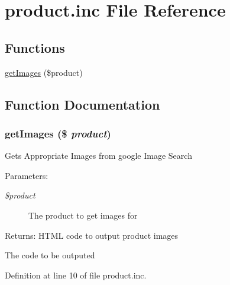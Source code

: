 \hypertarget{product_8inc}{
\section{product.inc File Reference}
\label{product_8inc}
}
\subsection*{Functions}
\begin{CompactItemize}
\item 
\hyperlink{product_8inc_9dbb778854cfe105058d7161ca8f058c}{getImages} (\$product)
\end{CompactItemize}


\subsection{Function Documentation}
\hypertarget{product_8inc_9dbb778854cfe105058d7161ca8f058c}{
\subsubsection{\setlength{\rightskip}{0pt plus 5cm}getImages (\$ {\em product})}}
\label{product_8inc_9dbb778854cfe105058d7161ca8f058c}


Gets Appropriate Images from google Image Search \begin{Desc}
\item[Parameters:]
\begin{description}
\item[{\em \$product}]The product to get images for \end{description}
\end{Desc}
\begin{Desc}
\item[Returns:]HTML code to output product images \end{Desc}


The code to be outputed 

Definition at line 10 of file product.inc.